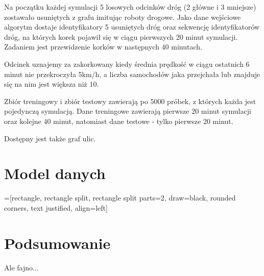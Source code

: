 \documentclass[a4paper,12pt]{mwart}
\begin{document}
Na początku każdej symulacji 5 losowych odcinków dróg (2 główne i 3 mniejsze) zostawało usuniętych z grafu imitując roboty drogowe. Jako dane wejściowe algorytm dostaje identyfikatory 5 usuniętych dróg oraz sekwencję identyfikatorów dróg, na których korek pojawił się w ciągu pierwszych 20 minut symulacji. Zadaniem jest przewidzenie korków w następnych 40 minutach.

Odcinek uznajemy za zakorkowany kiedy średnia prędkość w ciągu ostatnich 6 minut nie przekroczyła 5km/h, a liczba samochodów jaka przejchała lub znajduje się na nim jest większa niż 10.

Zbiór treningowy i zbiór testowy zawierają po 5000 próbek, z których każda jest pojedynczą symulacją. Dane treningowe zawierają pierwsze 20 minut symulacji oraz kolejne 40 minut, natomiast dane testowe - tylko pierwsze 20 minut.

Dostępny jest także graf ulic.

\section{Model danych}

=[rectangle, rectangle split, rectangle split parts=2, draw=black, rounded corners, text justified, align=left]


\section{Podsumowanie}
Ale fajno...
\end{document}
